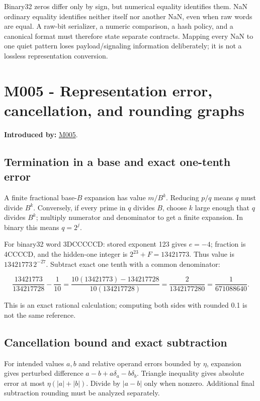 Binary32 zeros differ only by sign, but numerical equality identifies them. NaN ordinary equality identifies neither itself nor another NaN, even when raw words are equal. A raw-bit serializer, a numeric comparison, a hash policy, and a canonical format must therefore state separate contracts. Mapping every NaN to one quiet pattern loses payload/signaling information deliberately; it is not a lossless representation conversion.

\section{M005 - Representation error, cancellation, and rounding graphs}\label{01-foundations-i-ch011-m005---representation-error-cancellation-and-rounding-graphs}

\textbf{Introduced by:} \hyperref[01-foundations-i-ch001-when-arithmetic-meets-uncertainty]{M005}.

\subsection{Termination in a base and exact one-tenth error}\label{01-foundations-i-ch011-termination-in-a-base-and-exact-one-tenth-error}

A finite fractional base-\(B\) expansion has value \(m/B^k\). Reducing \(p/q\) means \(q\) must divide \(B^k\). Conversely, if every prime in \(q\) divides \(B\), choose \(k\) large enough that \(q\) divides \(B^k\); multiply numerator and denominator to get a finite expansion. In binary this means \(q=2^j\).

For binary32 word 3DCCCCCD: stored exponent 123 gives \(e=-4\); fraction is 4CCCCD, and the hidden-one integer is \(2^{23}+F=13421773\). Thus value is \(13421773\,2^{-27}\). Subtract exact one tenth with a common denominator:

\[
\frac{13421773}{134217728}-\frac1{10}
=\frac{10(13421773)-134217728}{10(134217728)}
=\frac{2}{1342177280}=\frac1{671088640}.
\]

This is an exact rational calculation; computing both sides with rounded 0.1 is not the same reference.

\subsection{Cancellation bound and exact subtraction}\label{01-foundations-i-ch011-cancellation-bound-and-exact-subtraction}

For intended values \(a,b\) and relative operand errors bounded by \(\eta\), expansion gives perturbed difference \(a-b+a\delta_a-b\delta_b\). Triangle inequality gives absolute error at most \(\eta(|a|+|b|)\). Divide by \(|a-b|\) only when nonzero. Additional final subtraction rounding must be analyzed separately.

